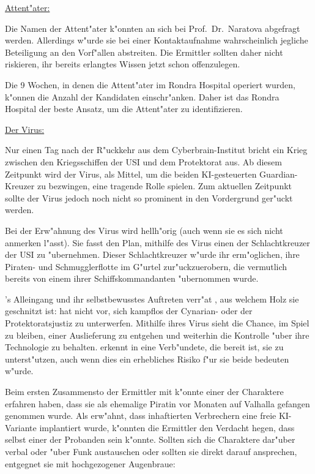 \begin{remarks}
	\underline{Attent"ater:}

	Die Namen der Attent"ater k"onnten an sich bei Prof.~Dr.~Naratova abgefragt werden. Allerdings w"urde sie bei einer Kontaktaufnahme wahrscheinlich jegliche Beteiligung an den Vorf"allen abstreiten. Die Ermittler sollten daher nicht riskieren, ihr bereits erlangtes Wissen jetzt schon offenzulegen.

	Die 9 Wochen, in denen die Attent"ater im Rondra Hospital operiert wurden, k"onnen die Anzahl der Kandidaten einschr"anken. Daher ist das Rondra Hospital der beste Ansatz, um die Attent"ater zu identifizieren.	

	\underline{Der Virus:}

	Nur einen Tag nach der R"uckkehr aus dem Cyberbrain-Institut bricht ein Krieg zwischen den Kriegsschiffen der USI und dem Protektorat aus. Ab diesem Zeitpunkt wird der Virus, als Mittel, um die beiden KI-gesteuerten Guardian-Kreuzer zu bezwingen, eine tragende Rolle spielen. Zum aktuellen Zeitpunkt sollte der Virus jedoch noch nicht so prominent in den Vordergrund ger"uckt werden.
\end{remarks}

Bei der Erw"ahnung des Virus wird \xl{} hellh"orig (auch wenn sie es sich nicht anmerken l"asst). Sie fasst den Plan, mithilfe des Virus einen der Schlachtkreuzer der USI zu "ubernehmen. Dieser Schlachtkreuzer w"urde ihr erm"oglichen, ihre Piraten- und Schmugglerflotte im G"urtel zur"uckzuerobern, die vermutlich bereits von einem ihrer Schiffskommandanten "ubernommen wurde.

\ml's Alleingang und ihr selbstbewusstes Auftreten verr"at \xl{}, aus welchem Holz sie geschnitzt ist: \ml{} hat nicht vor, sich kampflos der Cynarian- oder der Protektoratsjustiz zu unterwerfen. Mithilfe ihres Virus sieht \ml{} die Chance, im Spiel zu bleiben, einer Auslieferung zu entgehen und weiterhin die Kontrolle "uber ihre Technologie zu behalten. \xl{} erkennt in \ml{} eine Verb"undete, die bereit ist, sie zu unterst"utzen, auch wenn dies ein erhebliches Risiko f"ur sie beide bedeuten w"urde.

Beim ersten Zusammensto\3 der Ermittler mit \xl{} k"onnte einer der Charaktere erfahren haben, dass sie als ehemalige Piratin vor Monaten auf Valhalla gefangen genommen wurde. Als \ml{} erw"ahnt, dass inhaftierten Verbrechern eine freie KI-Variante implantiert wurde, k"onnten die Ermittler den Verdacht hegen, dass \xl{} selbst einer der Probanden sein k"onnte. Sollten sich die Charaktere dar"uber verbal oder "uber Funk austauschen oder sollten sie \xl{} direkt darauf ansprechen, entgegnet sie mit hochgezogener Augenbraue:


